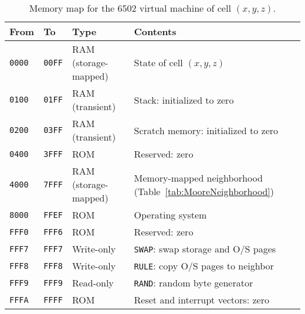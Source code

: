 \documentclass{article}
\newcommand\code[1]{{\tt #1}}
\newcommand\hex[1]{{\tt #1}}
\begin{document}
\newcommand\memrow[4]{
    {\tt {#1}00} & {\tt {#1}FF} & State of cell $(x#2,y#3,z#4)$ \\
}

\newcommand\memz[5]{
  \memrow{#1}{#4}{#5}{-1}
  \memrow{#2}{#4}{#5}{}
  \memrow{#3}{#4}{#5}{+1}
}

\newcommand\memyz[2]{
  \memz{{#1}0}{{#1}1}{{#1}2}{#2}{-1}
  \memz{{#1}4}{{#1}5}{{#1}6}{#2}{}
  \memz{{#1}8}{{#1}9}{{#1}A}{#2}{+1}
}

\newcommand\memxyz{
  \memyz{4}{-1}

  \memz{50}{51}{52}{}{-1}
  \memrow{54}{}{}{-1}
  \memrow{56}{}{}{+1}
  \memz{58}{59}{5A}{}{+1}

  \memyz{6}{+1}
}

\newcommand\vonneumannmap{\memtable{
  \memrow{45}{-1}{}{}
  \memrow{51}{}{-1}{}
  \memrow{54}{}{}{-1}
  \memrow{56}{}{}{+1}
  \memrow{59}{}{+1}{}
  \memrow{65}{+1}{}{}
}}

\newcommand\mooremap{\memtable{\memxyz}}

\begin{table}
\begin{tabular}{llll}
  \hline
  From & To & Type & Contents \\
  \hline
  \hex{0000} & \hex{00FF} & RAM (storage-mapped) & State of cell $(x,y,z)$ \\
  \hex{0100} & \hex{01FF} & RAM (transient) & Stack: initialized to zero \\
  \hex{0200} & \hex{03FF} & RAM (transient) & Scratch memory: initialized to zero \\
  \hex{0400} & \hex{3FFF} & ROM & Reserved: zero \\
  \hex{4000} & \hex{7FFF} & RAM (storage-mapped) & Memory-mapped neighborhood (Table~\ref{tab:MooreNeighborhood}) \\
  \hex{8000} & \hex{FFEF} & ROM & Operating system \\
  \hex{FFF0} & \hex{FFF6} & ROM & Reserved: zero \\
  \hex{FFF7} & \hex{FFF7} & Write-only & \code{SWAP}: swap storage and O/S pages \\
  \hex{FFF8} & \hex{FFF8} & Write-only & \code{RULE}: copy O/S pages to neighbor \\
  \hex{FFF9} & \hex{FFF9} & Read-only & \code{RAND}: random byte generator \\
  \hex{FFFA} & \hex{FFFF} & ROM & Reset and interrupt vectors: zero \\
  \hline
\end{tabular}
\caption{
  \label{tab:MemoryMap}
  Memory map for the 6502 virtual machine of cell $(x,y,z)$.
}
\end{table}
\end{document}
